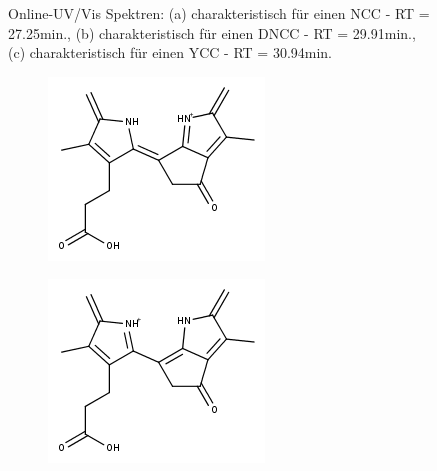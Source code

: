 \begin{figure}[!htbp]
\begin{subfigure}[b]{0.5\textwidth}
    \caption{}
    \label{fig:DNCC2991}
  \end{subfigure}
  \caption[Online-UV/Vis Spektren mit der Charakteristik eines NCC bei 27.10min., eines DNCC bei 29.75min. sowie eines YCC bei 30.94min., Quelle: Autor]{Online-UV/Vis Spektren: (a) charakteristisch für einen \gls{NCC} - RT = 27.25min., (b) charakteristisch für einen \gls{DNCC} - RT = 29.91min., (c) charakteristisch für einen \gls{YCC} - RT = 30.94min.}
\end{figure}

\begin{figure}[!htbp]
  \begin{subfigure}[b]{0.5\textwidth}
    \includegraphics[width=\textwidth]{figures/Kapitel7/Kataboliten/fragmentation_structures/VWA_Katabolit_619-CO2-RingD-RingA_311_Mesomer1.png}
    \caption{}
    \label{fig:NCC2725}
  \end{subfigure}
  \hfill
  \begin{subfigure}[b]{0.5\textwidth}
    \includegraphics[width=\textwidth]{figures/Kapitel7/Kataboliten/fragmentation_structures/VWA_Katabolit_619-CO2-RingD-RingA_311_Mesomer2.png}

\end{subfigure}
\end{figure}

